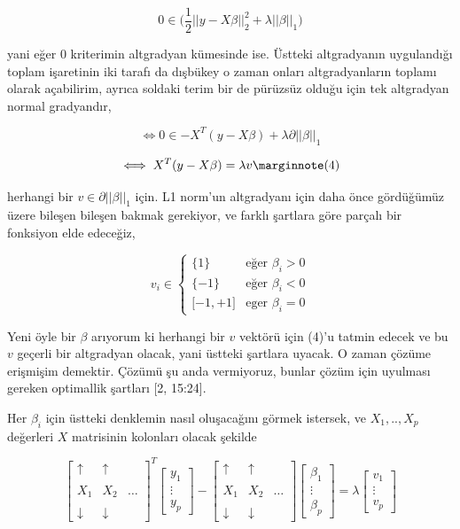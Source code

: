 \documentclass[12pt,fleqn]{article}\usepackage{../../common}
\begin{document}
$$
0 \in \big( 
\frac{1}{2} || y - X \beta ||_2^2 + \lambda ||\beta||_1
\big)
$$

yani eğer 0 kriterimin altgradyan kümesinde ise. Üstteki altgradyanın
uygulandığı toplam işaretinin iki tarafı da dışbükey o zaman onları
altgradyanların toplamı olarak açabilirim, ayrıca soldaki terim bir de
pürüzsüz olduğu için tek altgradyan normal gradyandır,

$$
\iff 0 \in -X^T (y - X\beta) + \lambda \partial ||\beta||_1
$$

$$
\iff X^T (y - X\beta) = \lambda v 
\mlabel{4}
$$

herhangi bir $v \in \partial ||\beta||_1$ için. L1 norm'un altgradyanı için
daha önce gördüğümüz üzere bileşen bileşen bakmak gerekiyor, ve farklı
şartlara göre parçalı bir fonksiyon elde edeceğiz, 

$$
v_i \in
\left\{ \begin{array}{ll}
\{1\} & \textrm{eğer } \beta_i > 0 \\
\{-1\} & \textrm{eğer } \beta_i < 0 \\
{[} -1,+1{]} & \textrm{eger } \beta_i = 0 
\end{array} \right.
$$

Yeni öyle bir $\beta$ arıyorum ki herhangi bir $v$ vektörü için (4)'u
tatmin edecek ve bu $v$ geçerli bir altgradyan olacak, yani üstteki
şartlara uyacak. O zaman çözüme erişmişim demektir. Çözümü şu anda
vermiyoruz, bunlar çözüm için uyulması gereken optimallik şartları [2,
15:24].

Her $\beta_i$ için üstteki denklemin nasıl oluşacağını görmek istersek, ve
$X_1,..,X_p$ değerleri $X$ matrisinin kolonları olacak şekilde

$$
\left[\begin{array}{ccc}
\uparrow & \uparrow & \\
&& \\
X_1 & X_2 & \dots \\
&& \\
\downarrow & \downarrow & 
\end{array}\right]^T
\left[\begin{array}{c}
y_1 \\ \vdots \\ y_p 
\end{array}\right] 
- 
\left[\begin{array}{ccc}
\uparrow & \uparrow & \\
&& \\
X_1 & X_2 & \dots \\
&& \\
\downarrow & \downarrow & 
\end{array}\right]
\left[\begin{array}{c}
\beta_1 \\ \vdots \\ \beta_p 
\end{array}\right]  =
\lambda
\left[\begin{array}{c}
v_1 \\ \vdots \\ v_p 
\end{array}\right] 
$$
\end{document}

